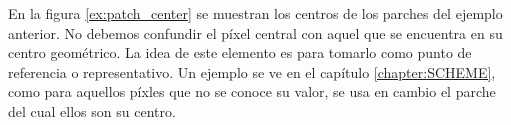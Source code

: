 En la figura \ref{ex:patch_center} se muestran los centros de los parches del ejemplo anterior. No debemos confundir el p\'ixel central con aquel que se encuentra en su centro geom\'etrico. La idea de este elemento es para tomarlo como punto de referencia o representativo. Un ejemplo se ve en el cap\'itulo \ref{chapter:SCHEME}, como para aquellos p\'ixles que no se conoce su valor, se usa en cambio el parche del cual ellos son su centro.